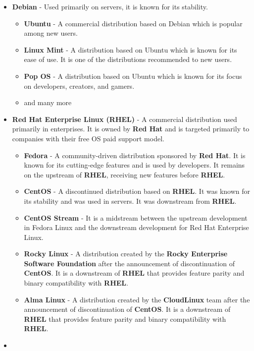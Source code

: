 \begin{itemize}
  \item
    \textbf{Debian} - Used primarily on servers, it is known for its stability.
    \begin{itemize}
      \item \textbf{Ubuntu} - A commercial distribution based on Debian which is popular among new users.
      \item \textbf{Linux Mint} - A distribution based on Ubuntu which is known for its ease of use. It is one of the distributions recommended to new users.
      \item \textbf{Pop OS} - A distribution based on Ubuntu which is known for its focus on developers, creators, and gamers.
      \item and many more
    \end{itemize}
  \item
    \textbf{Red Hat Enterprise Linux (RHEL)} - A commercial distribution used primarily in enterprises. It is owned by \textbf{Red Hat} and is targeted primarily to companies with their free OS paid support model.
    \begin{itemize}
      \item \textbf{Fedora} - A community-driven distribution sponsored by \textbf{Red Hat}. It is known for its cutting-edge features and is used by developers. It remains on the upstream of \textbf{RHEL}, receiving new features before \textbf{RHEL}.
      \item \textbf{CentOS} - A discontinued distribution based on \textbf{RHEL}. It was known for its stability and was used in servers. It was downstream from \textbf{RHEL}.
      \item \textbf{CentOS Stream} - It is a midstream between the upstream development in Fedora Linux and the downstream development for Red Hat Enterprise Linux.
      \item \textbf{Rocky Linux} - A distribution created by the \textbf{Rocky Enterprise Software Foundation} after the announcement of discontinuation of \textbf{CentOS}. It is a downstream of \textbf{RHEL} that provides feature parity and binary compatibility with \textbf{RHEL}.
      \item \textbf{Alma Linux} - A distribution created by the \textbf{CloudLinux} team after the announcement of discontinuation of \textbf{CentOS}. It is a downstream of \textbf{RHEL} that provides feature parity and binary compatibility with \textbf{RHEL}.
    \end{itemize}
  \item

\end{itemize}
